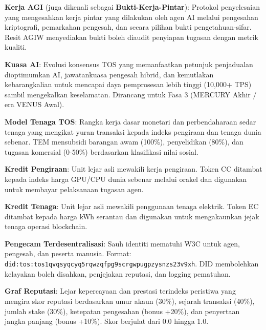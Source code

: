 \documentclass[11pt]{article}
\begin{document}
\begin{description}[leftmargin=3cm, style=nextline]
  \item[AGIW (PoIW)] \textbf{Kerja AGI} (juga dikenali sebagai \textbf{Bukti-Kerja-Pintar}): Protokol penyelesaian yang mengesahkan kerja pintar yang dilakukan oleh agen AI melalui pengesahan kriptografi, pemarkahan pengesah, dan secara pilihan bukti pengetahuan-sifar. Resit AGIW menyediakan bukti boleh diaudit penyiapan tugasan dengan metrik kualiti.

  \item[PAI] \textbf{Kuasa AI}: Evolusi konsensus TOS yang memanfaatkan petunjuk penjadualan dioptimumkan AI, jawatankuasa pengesah hibrid, dan kemutlakan kebarangkalian untuk mencapai daya pemprosesan lebih tinggi (10,000+ TPS) sambil mengekalkan keselamatan. Dirancang untuk Fasa 3 (MERCURY Akhir / era VENUS Awal).

  \item[TEM] \textbf{Model Tenaga TOS}: Rangka kerja dasar monetari dan perbendaharaan sedar tenaga yang mengikat yuran transaksi kepada indeks pengiraan dan tenaga dunia sebenar. TEM mensubsidi barangan awam (100\%), penyelidikan (80\%), dan tugasan komersial (0-50\%) berdasarkan klasifikasi nilai sosial.

  \item[CC] \textbf{Kredit Pengiraan}: Unit lejar asli mewakili kerja pengiraan. Token CC ditambat kepada indeks harga GPU/CPU dunia sebenar melalui orakel dan digunakan untuk membayar pelaksanaan tugasan agen.

  \item[EC] \textbf{Kredit Tenaga}: Unit lejar asli mewakili penggunaan tenaga elektrik. Token EC ditambat kepada harga kWh serantau dan digunakan untuk mengakaunkan jejak tenaga operasi blockchain.

  \item[DID] \textbf{Pengecam Terdesentralisasi}: Sauh identiti mematuhi W3C untuk agen, pengesah, dan peserta manusia. Format: \texttt{did:tos:tos1qvqsyqcyq5rqwzqfpg9scrgwpugpzysnzs23v9xh}. DID membolehkan kelayakan boleh disahkan, penjejakan reputasi, dan logging pematuhan.

  \item[RepGraph] \textbf{Graf Reputasi}: Lejar kepercayaan dan prestasi terindeks peristiwa yang mengira skor reputasi berdasarkan umur akaun (30\%), sejarah transaksi (40\%), jumlah stake (30\%), ketepatan pengesahan (bonus +20\%), dan penyertaan jangka panjang (bonus +10\%). Skor berjulat dari 0.0 hingga 1.0.


\end{description}
\end{document}
